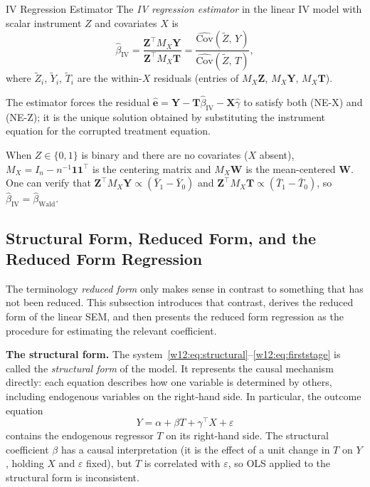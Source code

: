 \documentclass[master.tex]{subfiles}
\begin{document}
\begin{defn}{IV Regression Estimator}
\label{w12:defn:iv-reg}
The \emph{IV regression estimator} in the linear IV model with
scalar instrument $Z$ and covariates $X$ is
\begin{equation}
  \hat\beta_{\mathrm{IV}}
  = \frac{\mathbf{Z}^\top M_X \mathbf{Y}}
         {\mathbf{Z}^\top M_X \mathbf{T}}
  = \frac{\widehat{\mathrm{Cov}}(\tilde{Z},\, Y)}
         {\widehat{\mathrm{Cov}}(\tilde{Z},\, T)},
  \label{w12:eq:iv-reg}
\end{equation}
where $\tilde{Z}_i$, $\tilde{Y}_i$, $\tilde{T}_i$ are the within-$X$
residuals (entries of $M_X\mathbf{Z}$, $M_X\mathbf{Y}$,
$M_X\mathbf{T}$).
\end{defn}

The estimator forces the residual $\hat{\mathbf{e}} = \mathbf{Y} -
\mathbf{T}\hat\beta_{\mathrm{IV}} - \mathbf{X}\hat\gamma$ to satisfy
both (NE-X) and (NE-Z); it is the unique solution obtained by
substituting the instrument equation for the corrupted treatment
equation.

\begin{remark}
When $Z \in \{0,1\}$ is binary and there are no covariates ($X$
absent), $M_X = I_n - n^{-1}\mathbf{1}\mathbf{1}^\top$ is the
centering matrix and $M_X\mathbf{W}$ is the mean-centered $\mathbf{W}$.
One can verify that $\mathbf{Z}^\top M_X\mathbf{Y} \propto
(\bar{Y}_1 - \bar{Y}_0)$ and $\mathbf{Z}^\top M_X\mathbf{T} \propto
(\bar{T}_1 - \bar{T}_0)$, so $\hat\beta_{\mathrm{IV}} =
\hat\beta_{\mathrm{Wald}}$.
\end{remark}

\subsection{Structural Form, Reduced Form, and the Reduced Form Regression}
\label{w12:subsec:reduced-form}

The terminology \emph{reduced form} only makes sense in contrast to
something that has not been reduced.  This subsection introduces that
contrast, derives the reduced form of the linear SEM, and then
presents the reduced form regression as the procedure for estimating
the relevant coefficient.

\medskip\noindent\textbf{The structural form.}
The system~\eqref{w12:eq:structural}--\eqref{w12:eq:firststage} is
called the \emph{structural form} of the model.  It represents the
causal mechanism directly: each equation describes how one variable
is determined by others, including endogenous variables on the
right-hand side.  In particular, the outcome equation
\[
  Y = \alpha + \beta T + \gamma^\top X + \varepsilon
\]
contains the endogenous regressor $T$ on its right-hand side.
The structural coefficient $\beta$ has a causal interpretation
(it is the effect of a unit change in $T$ on $Y$, holding $X$ and
$\varepsilon$ fixed), but $T$ is correlated with $\varepsilon$,
so OLS applied to the structural form is inconsistent.
\end{document}
